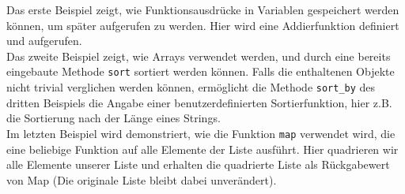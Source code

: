 \begin{ruby}[label=IRB]
         

\PY{o}{[}\PY{o}{]}

\PY{o}{[}      \PY{o}{]}   

   
\end{ruby}
Das erste Beispiel zeigt, wie Funktionsausdrücke in Variablen gespeichert werden können, um später aufgerufen zu werden. Hier wird eine Addierfunktion definiert und aufgerufen.\\
Das zweite Beispiel zeigt, wie Arrays verwendet werden, und durch eine bereits eingebaute Methode \texttt{sort} sortiert werden können. Falls die enthaltenen Objekte nicht trivial verglichen werden können, ermöglicht die Methode \texttt{sort\_by} des dritten Beispiels die Angabe einer benutzerdefinierten Sortierfunktion, hier z.B. die Sortierung nach der Länge eines Strings.\\
Im letzten Beispiel wird demonstriert, wie die Funktion \texttt{map} verwendet wird, die eine beliebige Funktion auf alle Elemente der Liste ausführt. Hier quadrieren wir alle Elemente unserer Liste und erhalten die quadrierte Liste als Rückgabewert von Map (Die originale Liste bleibt dabei unverändert).



